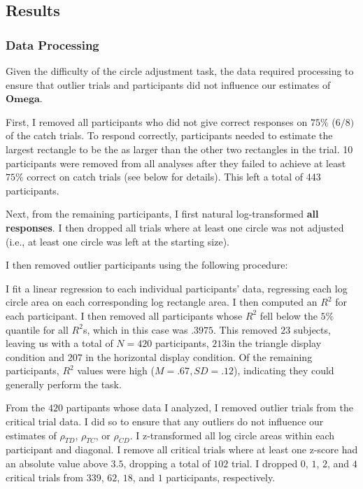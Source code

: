 \subsection{Results}
\subsubsection{Data Processing}
Given the difficulty of the circle adjustment task, the data required processing to ensure that outlier trials and participants did not influence our estimates of $\mathbf{Omega}$.

First, I removed all participants who did not give correct responses on $75\%$ ($6/8)$ of the catch trials. To respond correctly, participants needed to estimate the largest rectangle to be the as larger than the other two rectangles in the trial. 10 participants were removed from all analyses after they failed to achieve at least $75\%$ correct on catch trials (see below for details). This left a total of 443 participants.

Next, from the remaining participants, I first natural log-transformed \textbf{all responses}. I then dropped all trials where at least one circle was not adjusted (i.e., at least one circle was left at the starting size).

I then removed outlier participants using the following procedure:

I fit a linear regression to each individual participants' data, regressing each log circle area on each corresponding log rectangle area. I then computed an $R^2$ for each participant. I then removed all participants whose $R^2$ fell below the $5\%$ quantile for all $R^2$s, which in this case was $.3975$. This removed $23$ subjects, leaving us with a total of $N=420$ participants, $213 $in the triangle display condition and $207$ in the horizontal display condition. Of the remaining participants, $R^2$ values were high ($M=.67,SD=.12$), indicating they could generally perform the task.

From the $420$ partipants whose data I analyzed, I removed outlier trials from the critical trial data. I did so to ensure that any outliers do not influence our estimates of $\rho_{TD}$, $\rho_{TC}$, or $\rho_{CD}$. I z-transformed all log circle areas within each participant and diagonal. I remove all critical trials where at least one z-score had an absolute value above $3.5$, dropping a total of $102$ trial. I dropped $0$, $1$, $2$, and $4$ critical trials from $339$, $62$, $18$, and $1$ participants, respectively. 

